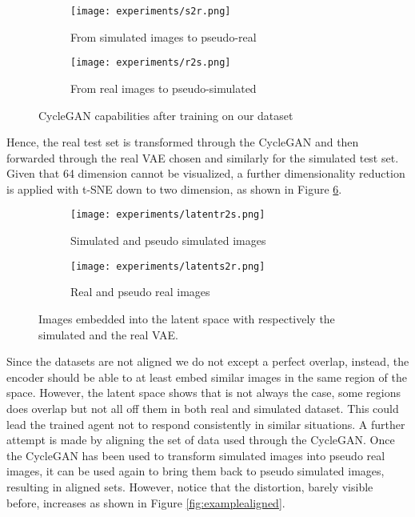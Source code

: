 \begin{figure}[h]
  \centering
  \begin{subfigure}{.6\linewidth}
      \centering
      \texttt{[image: experiments/s2r.png]}
      \caption{From simulated images to pseudo-real}\label{fig:s2r}
  \end{subfigure}
      \hfill
  \begin{subfigure}{.6\linewidth}
      \centering
      \texttt{[image: experiments/r2s.png]}
      \caption{From real images to pseudo-simulated}\label{fig:r2s}
  \end{subfigure}
  \caption{CycleGAN capabilities after training on our dataset}
  \label{fig:cycleganexample}
\end{figure}
Hence, the real test set is transformed through the CycleGAN and then forwarded through the real VAE chosen and similarly for the simulated test set. Given that 64 dimension cannot be visualized, a further dimensionality reduction is applied with t-SNE down to two dimension, as shown in Figure \ref{fig:latentpseudo}.
\begin{figure}[h]
  \centering
  \begin{subfigure}{.5\linewidth}
      \centering
      \texttt{[image: experiments/latentr2s.png]}
      \caption{Simulated and pseudo simulated images}\label{fig:latentr2s}
  \end{subfigure}%
      \hfill
  \begin{subfigure}{.5\linewidth}
      \centering
      \texttt{[image: experiments/latents2r.png]}
      \caption{Real and pseudo real images}\label{fig:latents2r}
  \end{subfigure}
  \caption{Images embedded into the latent space with respectively the simulated and the real VAE.}
  \label{fig:latentpseudo}
\end{figure}
Since the datasets are not aligned we do not except a perfect overlap, instead, the encoder should be able to at least embed similar images in the same region of the space. However, the latent space shows that is not always the case, some regions does overlap but not all off them in both real and simulated dataset. This could lead the trained agent not to respond consistently in similar situations. A further attempt is made by aligning the set of data used through the CycleGAN. Once the CycleGAN has been used to transform simulated images into pseudo real images, it can be used again to bring them back to pseudo simulated images, resulting in aligned sets. However, notice that the distortion, barely visible before, increases as shown in Figure \ref{fig:examplealigned}.
